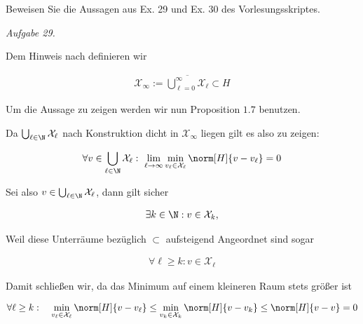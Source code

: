 
\begin{exercise}

Beweisen Sie die Aussagen aus Ex. 29 und Ex. 30 des Vorlesungsskriptes.

\end{exercise}


\begin{solution}

\textit{Aufgabe 29.}

Dem Hinweis nach definieren wir

\begin{align*}
  \mathcal{X}_\infty
  :=
  \overline{\bigcup_{\ell=0}^\infty \mathcal{X}_\ell}
  \subset H
\end{align*}

Um die Aussage zu zeigen werden wir nun Proposition $1.7$ benutzen.


Da $\bigcup_{\ell \in \N} \mathcal{X}_\ell$ nach Konstruktion dicht in $\mathcal{X}_\infty$ liegen gilt es also zu zeigen:

\begin{align*}
  \forall v \in \bigcup_{\ell \in \N} \mathcal{X}_\ell: ~
  \lim_{\ell \to \infty} \min_{v_\ell \in \mathcal{X}_\ell}
  \norm[H]{v - v_\ell} = 0
\end{align*}

Sei also $v \in \bigcup_{\ell \in \N} \mathcal{X}_\ell$, dann gilt sicher

\begin{align*}
  \exists k \in \N: v \in \mathcal{X}_k,
\end{align*}

Weil diese Unterräume bezüglich $\subset$ aufsteigend Angeordnet sind sogar

\begin{align*}
  \forall \ell \geq k: v \in \mathcal{X}_\ell
\end{align*}

Damit schließen wir, da das Minimum auf einem kleineren Raum stets größer ist

\begin{align*}
  \forall \ell \geq k: \quad
  \min_{v_\ell \in \mathcal{X}_\ell} \norm[H]{v - v_\ell}
  \leq
  \min_{v_k \in \mathcal{X}_k} \norm[H]{v - v_k}
  \leq
  \norm[H]{v-v}
  =
  0
\end{align*}


\end{solution}
